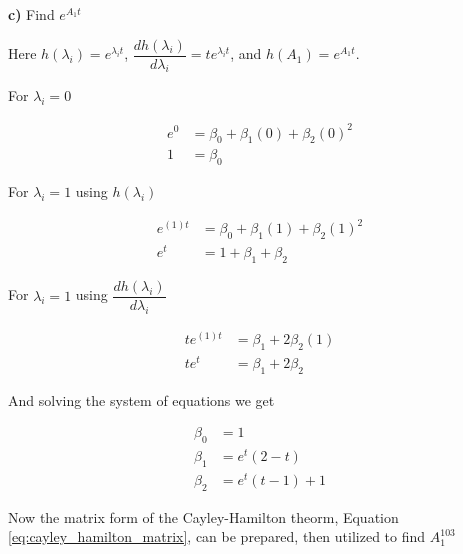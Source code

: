 \noindent \textbf{c)} Find $e^{A_1 t}$

Here $h(\lambda_i) = e^{\lambda_i t}$, 
$\dfrac{d h(\lambda_i)}{d \lambda_i} = te^{\lambda_i t}$, and 
$h(A_1) = e^{A_1 t}$.

For $\lambda_i = 0$

\begin{align}
  e^0 &= \beta_0 + \beta_1 (0) + \beta_2 (0)^2 \nonumber \\
    1 &= \beta_0 
\end{align}

For $\lambda_i = 1$ using $h(\lambda_i)$


\begin{align}
  e^{(1)t} &= \beta_0 + \beta_1 (1) + \beta_2 (1)^2 \nonumber \\
       e^t &= 1 + \beta_1 + \beta_2
\end{align}

For $\lambda_i = 1$ using $\dfrac{d h(\lambda_i)}{d \lambda_i}$


\begin{align}
  te^{(1)t} &= \beta_1 + 2 \beta_2 (1) \nonumber \\
       te^t &= \beta_1 + 2 \beta_2
\end{align}

And solving the system of equations we get

\begin{align}
  \beta_0 &= 1  \nonumber \\
  \beta_1 &= e^t (2 - t) \\
  \beta_2 &= e^t (t -1) + 1 \nonumber
\end{align}

Now the matrix form of the Cayley-Hamilton theorm, 
Equation \ref{eq:cayley_hamilton_matrix}, can be prepared, then utilized to find
$A_1^{103}$

